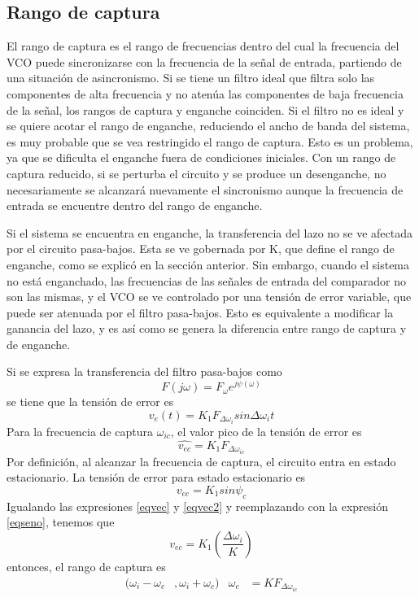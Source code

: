 \subsection{Rango de captura}
El rango de captura es el rango de frecuencias dentro del cual la frecuencia del VCO puede sincronizarse con la frecuencia de la señal de entrada, partiendo de una situación de asincronismo. Si se tiene un filtro ideal que filtra solo las componentes de alta frecuencia y no atenúa las componentes de baja frecuencia de la señal, los rangos de captura y enganche coinciden. Si el filtro no es ideal y se quiere acotar el rango de enganche, reduciendo el ancho de banda del sistema, es muy probable que se vea restringido el rango de captura. Esto es un problema, ya que se dificulta el enganche fuera de condiciones iniciales. Con un rango de captura reducido, si se perturba el circuito y se produce un desenganche, no necesariamente se alcanzará nuevamente el sincronismo aunque la frecuencia de entrada se encuentre dentro del rango de enganche.

Si el sistema se encuentra en enganche, la transferencia del lazo no se ve afectada por el circuito pasa-bajos. Esta se ve gobernada por K, que define el rango de enganche, como se explicó en la sección anterior. Sin embargo, cuando el sistema no está enganchado, las frecuencias de las señales de entrada del comparador no son las mismas, y el VCO se ve controlado por una tensión de error variable, que puede ser atenuada por el filtro pasa-bajos. Esto es equivalente a modificar la ganancia del lazo, y es así como se genera la diferencia entre rango de captura y de enganche.

Si se expresa la transferencia del filtro pasa-bajos como
\begin{equation}
    F(j\omega)=F_{\omega}e^{j\psi(\omega)}
\end{equation}
se tiene que la tensión de error es
\begin{equation}
    v_{e}(t)=K_{1}F_{\Delta\omega_{i}} sin \Delta\omega_{i}t
\end{equation}
Para la frecuencia de captura $\omega_{ic}$, el valor pico de la tensión de error es
\begin{equation}\label{eqvec}
    \hat{v_{ec}}=K_{1}F_{\Delta\omega_{ic}}
\end{equation}
Por definición, al alcanzar la frecuencia de captura, el circuito entra en estado estacionario. La tensión de error para estado estacionario es
\begin{equation}\label{eqvec2}
    v_{ec}=K_{1} sin\psi_{c}
\end{equation}
Igualando las expresiones \ref{eqvec} y \ref{eqvec2} y reemplazando con la expresión \ref{eqseno}, tenemos que
\begin{equation}
    v_{ec}=K_{1}(\frac{\Delta\omega_{i}}{K})
\end{equation}
entonces, el rango de captura es 
\begin{align}\label{rangocap}
    (\omega_{i}-\omega_{c} &, \omega_{i}+\omega_{c})   &   \omega_{c}&=KF_{\Delta\omega_{ic}}
\end{align}
